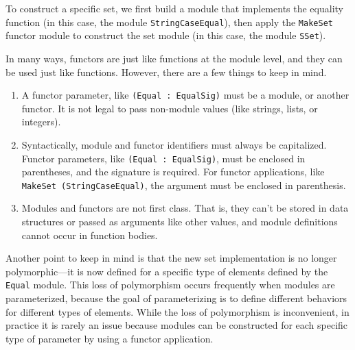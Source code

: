 To construct a specific set, we first build a module that implements
the equality function (in this case, the
module \hbox{\lstinline/StringCaseEqual/}), then apply
the \hbox{\lstinline/MakeSet/} functor module to construct the set
module (in this case, the module \hbox{\lstinline/SSet/}).

In many ways, functors are just like functions at the module level,
and they can be used just like functions.  However, there are a few
things to keep in mind.

\begin{enumerate}

\item{}

A functor parameter, like \hbox{\lstinline/(Equal : EqualSig)/} must be a module,
or another functor. It is not legal to pass non-module values (like
strings, lists, or integers).

\item{}

Syntactically, module and functor identifiers must always be
capitalized. Functor parameters, like
\hbox{\lstinline/(Equal : EqualSig)/},
must be enclosed in parentheses, and the signature is required. For
functor applications, like
\hbox{\lstinline/MakeSet (StringCaseEqual)/},
the argument must be enclosed in parenthesis.

\item{}

Modules and functors are not first class. That is, they can't be
stored in data structures or passed as arguments like other values,
and module definitions cannot occur in function bodies.


\end{enumerate}
%
Another point to keep in mind is that the new set implementation is no
longer polymorphic---it is now defined for a specific type of elements
defined by the \hbox{\lstinline/Equal/} module. This loss of
polymorphism occurs frequently when modules are parameterized, because
the goal of parameterizing is to define different behaviors for
different types of elements. While the loss of polymorphism is
inconvenient, in practice it is rarely an issue because modules can be
constructed for each specific type of parameter by using a functor
application.

